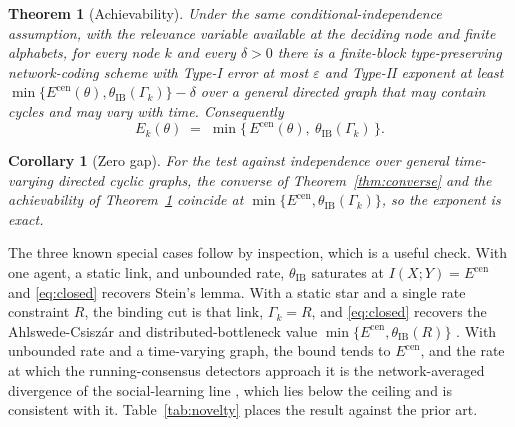 \documentclass[journal]{IEEEtran}
\newtheorem{theorem}{Theorem}
\newtheorem{corollary}{Corollary}
\theoremstyle{definition}
\theoremstyle{remark}
\newcommand{\Ecen}{E^{\mathrm{cen}}}
\newcommand{\tib}{\theta_{\mathrm{IB}}}
\newcommand{\Gk}{\Gamma_k}
\begin{document}
\begin{theorem}[Achievability]\label{thm:achieve}
Under the same conditional-independence assumption, with the relevance variable available at the deciding node
and finite alphabets, for every node $k$ and every $\delta>0$ there is a finite-block type-preserving
network-coding scheme with Type-I error at most $\varepsilon$ and Type-II exponent at least
$\min\{\Ecen(\theta),\tib(\Gk)\}-\delta$ over a general directed graph that may contain cycles and may vary with
time. Consequently
\begin{equation}
E_k(\theta) \;=\; \min\{\,\Ecen(\theta),\ \tib(\Gk)\,\}. \label{eq:closed}
\end{equation}
\end{theorem}

\begin{corollary}[Zero gap]\label{cor:zerogap}
For the test against independence over general time-varying directed cyclic graphs, the converse of
Theorem~\ref{thm:converse} and the achievability of Theorem~\ref{thm:achieve} coincide at
$\min\{\Ecen,\tib(\Gk)\}$, so the exponent is exact.
\end{corollary}

The three known special cases follow by inspection, which is a useful check. With one agent, a static link, and
unbounded rate, $\tib$ saturates at $I(X;Y)=\Ecen$ and \eqref{eq:closed} recovers Stein's lemma. With a static
star and a single rate constraint $R$, the binding cut is that link, $\Gk=R$, and \eqref{eq:closed} recovers the
Ahlswede-Csisz\'ar and distributed-bottleneck value $\min\{\Ecen,\tib(R)\}$
\cite{ahlswedecsiszar1986,aguerrizaidi2018}. With unbounded rate and a time-varying graph, the bound tends to
$\Ecen$, and the rate at which the running-consensus detectors approach it is the network-averaged divergence of
the social-learning line \cite{nou2017,lalitha2018}, which lies below the ceiling and is consistent with it.
Table~\ref{tab:novelty} places the result against the prior art.
\end{document}

